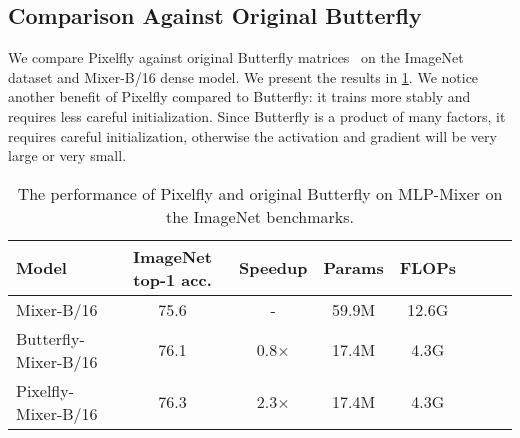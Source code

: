 \subsection{Comparison Against Original Butterfly}
\label{subsec:original_butterfly}

We compare Pixelfly against original Butterfly
matrices~\citep{dao2020kaleidoscope} on the ImageNet dataset and Mixer-B/16
dense model.
We present the results in \cref{table:original_butterfly}.
We notice another benefit of Pixelfly compared to Butterfly: it trains more stably and requires less careful initialization. Since Butterfly is a product of many factors, it requires careful initialization, otherwise the activation and gradient will be very large or very small.

\begin{table}[h]
  \centering
  \caption{\label{table:original_butterfly}The performance of Pixelfly and
    original Butterfly on MLP-Mixer on the ImageNet benchmarks.}
  \begin{tabular}{@{}lccccccc@{}}
    Model&\multicolumn{1}{c}{ImageNet top-1 acc.}&\multicolumn{1}{c}{Speedup} &\multicolumn{1}{c}{Params} & \multicolumn{1}{c}{FLOPs} \\
    \midrule
    Mixer-B/16& 75.6& - & 59.9M & 12.6G \\
    Butterfly-Mixer-B/16& 76.1& 0.8$\times$ & 17.4M & 4.3G \\
    Pixelfly-Mixer-B/16& 76.3& 2.3$\times$ & 17.4M & 4.3G \\
    \bottomrule
  \end{tabular}
\end{table}


